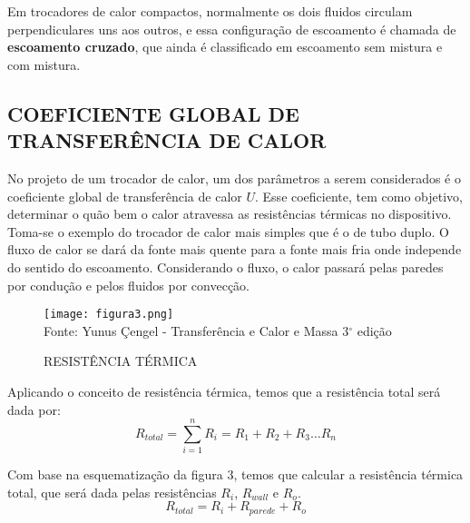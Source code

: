 \documentclass[a4paper,12pt,oneside]{article}
\begin{document}
\begin{flushright}
Em trocadores de calor compactos, normalmente os dois fluidos circulam perpendiculares uns aos outros, e essa configuração de escoamento é chamada de \textbf{escoamento cruzado}, que ainda é classificado em escoamento sem mistura e com mistura.

\pagebreak
\clearpage
\newpage

\subsection{\large COEFICIENTE GLOBAL DE TRANSFERÊNCIA DE CALOR}
\vspace{0.5cm}

No projeto de um trocador de calor, um dos parâmetros a serem considerados é o coeficiente global de transferência de calor $U$. Esse coeficiente, tem como objetivo, determinar o quão bem o calor atravessa as resistências térmicas no dispositivo. Toma-se o exemplo do trocador de calor mais simples que é o de tubo duplo. O fluxo de calor se dará da fonte mais quente para a fonte mais fria onde independe do sentido do escoamento. Considerando o fluxo, o calor passará pelas paredes por condução e pelos fluidos por convecção. \\

\begin{figure}[h]
	\centering
	\caption{RESISTÊNCIA TÉRMICA}
	\vspace{0.5cm}
	\texttt{[image: figura3.png]}
	\vspace{0.5cm}\\
	Fonte: Yunus Çengel - Transferência e Calor e Massa 3$^\circ$ edição
\end{figure}
\vspace{0.5cm}

\pagebreak
\clearpage
\newpage

Aplicando o conceito de resistência térmica, temos que a resistência total será dada por:\\

\begin{equation}\label{eq1}
R_{total} = \sum_{i = 1}^{n}R_{i}  = R_{1} + R_{2} + R_{3}\dots R_{n}
\end{equation}
\vspace{0.5cm}

Com base na esquematização da figura 3, temos que calcular a resistência térmica total, que será dada pelas resistências $R_{i}$, $R_{wall}$ e $R_{o}$.\\

\begin{equation}\label{eq2}
R_{total} = R_{i} + R_{parede} + R_{o}
\end{equation}
\vspace{0.5cm}


\end{flushright}
\end{document}
